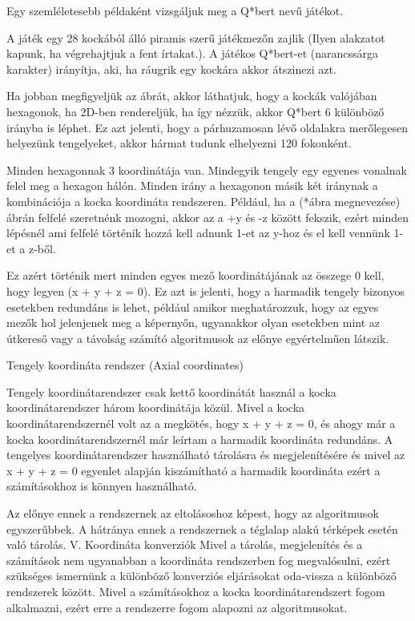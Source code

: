 Egy szemléletesebb példaként vizsgáljuk meg a Q*bert nevű játékot.

A játék egy 28 kockából álló piramis szerű játékmezőn zajlik (Ilyen alakzatot kapunk, ha végrehajtjuk a fent írtakat.). A játékos Q*bert-et (narancssárga karakter) irányítja, aki, ha ráugrik egy kockára akkor átszinezi azt.

Ha jobban megfigyeljük az ábrát, akkor láthatjuk, hogy a kockák valójában hexagonok, ha 2D-ben rendereljük, ha így nézzük, akkor Q*bert 6 különböző irányba is léphet. Ez azt jelenti, hogy a párhuzamosan lévő oldalakra merőlegesen helyezünk tengelyeket, akkor hármat tudunk elhelyezni 120 fokonként.

Minden hexagonnak 3 koordinátája van. 
Mindegyik tengely egy egyenes vonalnak felel meg a hexagon hálón.
Minden irány a hexagonon másik két iránynak a kombinációja a kocka koordináta rendszeren. Például, ha a (*ábra megnevezése) ábrán felfelé szeretnénk mozogni, akkor az a +y és -z között fekszik, ezért minden lépésnél ami felfelé történik hozzá kell adnunk 1-et az y-hoz és el kell vennünk 1-et a z-ből. 

Ez azért történik mert minden egyes mező koordinátájának az összege 0 kell, hogy legyen (x + y + z = 0). Ez azt is jelenti, hogy a harmadik tengely bizonyos esetekben redundáns is lehet, például amikor meghatározzuk, hogy az egyes mezők hol jelenjenek meg a képernyőn, ugyanakkor olyan esetekben mint az útkereső vagy a távolság számító algoritmusok az előnye egyértelműen látszik. 

Tengely koordináta rendszer (Axial coordinates)

Tengely koordinátarendszer csak kettő koordinátát használ a kocka koordinátarendszer három koordinátája közül. Mivel a kocka koordinátarendszernél volt az a megkötés, hogy x + y + z = 0, és ahogy már a kocka koordinátarendszernél már leírtam a harmadik koordináta redundáns.  A tengelyes koordinátarendszer használható tárolásra és megjelenítésére és mivel az x + y + z = 0 egyenlet alapján kiszámítható a harmadik koordináta ezért a számításokhoz is könnyen használható.

Az előnye ennek a rendszernek az eltolásoshoz képest, hogy az algoritmusok egyszerűbbek. A hátránya ennek a rendszernek a téglalap alakú térképek esetén való tárolás. 
V. Koordináta konverziók
Mivel a tárolás, megjelenítés és a számítások nem ugyanabban a koordináta rendszerben fog megvalósulni, ezért szükséges ismernünk a különböző konverziós eljárásokat oda-vissza a különböző rendszerek között. Mivel a számításokhoz a kocka koordinátarendszert fogom alkalmazni, ezért erre a rendszerre fogom alapozni az algoritmusokat.

